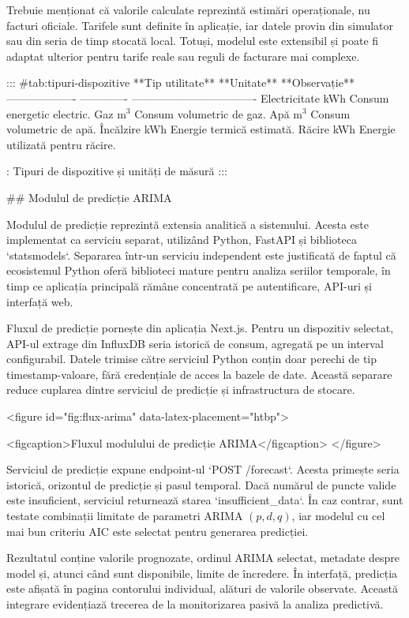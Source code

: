 Trebuie menționat că valorile calculate reprezintă estimări
operaționale, nu facturi oficiale. Tarifele sunt definite în aplicație,
iar datele provin din simulator sau din seria de timp stocată local.
Totuși, modelul este extensibil și poate fi adaptat ulterior pentru
tarife reale sau reguli de facturare mai complexe.

::: {#tab:tipuri-dispozitive}
  **Tip utilitate**   **Unitate**   **Observație**
  ------------------- ------------- ----------------------------------
  Electricitate       kWh           Consum energetic electric.
  Gaz                 m$^3$         Consum volumetric de gaz.
  Apă                 m$^3$         Consum volumetric de apă.
  Încălzire           kWh           Energie termică estimată.
  Răcire              kWh           Energie utilizată pentru răcire.

  : Tipuri de dispozitive și unități de măsură
:::

## Modulul de predicție ARIMA

Modulul de predicție reprezintă extensia analitică a sistemului. Acesta
este implementat ca serviciu separat, utilizând Python, FastAPI și
biblioteca `statsmodels`. Separarea într-un serviciu independent este
justificată de faptul că ecosistemul Python oferă biblioteci mature
pentru analiza seriilor temporale, în timp ce aplicația principală
rămâne concentrată pe autentificare, API-uri și interfață web.

Fluxul de predicție pornește din aplicația Next.js. Pentru un dispozitiv
selectat, API-ul extrage din InfluxDB seria istorică de consum, agregată
pe un interval configurabil. Datele trimise către serviciul Python
conțin doar perechi de tip timestamp-valoare, fără credențiale de acces
la bazele de date. Această separare reduce cuplarea dintre serviciul de
predicție și infrastructura de stocare.

<figure id="fig:flux-arima" data-latex-placement="htbp">

<figcaption>Fluxul modulului de predicție ARIMA</figcaption>
</figure>

Serviciul de predicție expune endpoint-ul `POST /forecast`. Acesta
primește seria istorică, orizontul de predicție și pasul temporal. Dacă
numărul de puncte valide este insuficient, serviciul returnează starea
`insufficient_data`. În caz contrar, sunt testate combinații limitate de
parametri ARIMA $(p,d,q)$, iar modelul cu cel mai bun criteriu AIC este
selectat pentru generarea predicției.

Rezultatul conține valorile prognozate, ordinul ARIMA selectat, metadate
despre model și, atunci când sunt disponibile, limite de încredere. În
interfață, predicția este afișată în pagina contorului individual,
alături de valorile observate. Această integrare evidențiază trecerea de
la monitorizarea pasivă la analiza predictivă.

